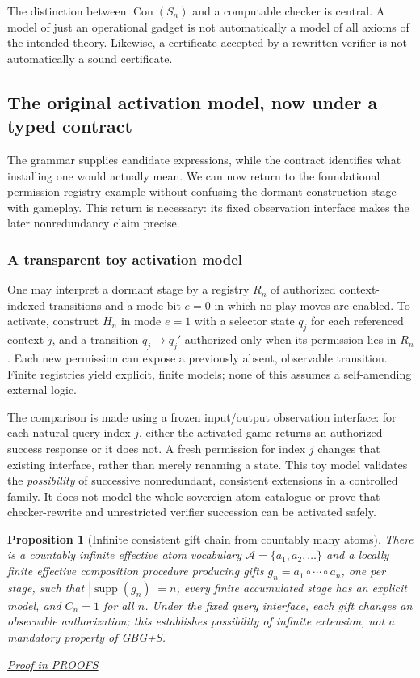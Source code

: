 \documentclass[11pt,letterpaper]{article}
\newtheorem{proposition}[theorem]{Proposition}
\theoremstyle{definition}\newtheorem{definition}[theorem]{Definition}\newtheorem{example}[theorem]{Example}
\theoremstyle{remark}\newtheorem{remark}[theorem]{Remark}
\newcommand{\Con}{\operatorname{Con}}
\newcommand{\Abs}{\mathcal{A}}
\newcommand{\proofat}[1]{\par\smallskip\noindent\hfill\textit{\hyperref[#1]{Proof in PROOFS}}}
\begin{document}
The distinction between $\Con(S_n)$ and a computable checker is central. A model of just an operational gadget is not automatically a model of all axioms of the intended theory. Likewise, a certificate accepted by a rewritten verifier is not automatically a sound certificate.



\subsection{The original activation model, now under a typed contract}
The grammar supplies candidate expressions, while the contract identifies what installing one
would actually mean.  We can now return to the foundational permission-registry example
without confusing the dormant construction stage with gameplay.  This return is necessary:
its fixed observation interface makes the later nonredundancy claim precise.

\subsubsection{A transparent toy activation model}
One may interpret a dormant stage by a registry $R_n$ of authorized context-indexed transitions and a mode bit $e=0$ in which no play moves are enabled. To activate, construct $H_n$ in mode $e=1$ with a selector state $q_j$ for each referenced context $j$, and a transition $q_j\to q_j'$ authorized only when its permission lies in $R_n$. Each new permission can expose a previously absent, observable transition. Finite registries yield explicit, finite models; none of this assumes a self-amending external logic.

The comparison is made using a frozen input/output observation interface: for each natural query index $j$, either the activated game returns an authorized success response or it does not. A fresh permission for index $j$ changes that existing interface, rather than merely renaming a state. This toy model validates the \emph{possibility} of successive nonredundant, consistent extensions in a controlled family. It does not model the whole sovereign atom catalogue or prove that checker-rewrite and unrestricted verifier succession can be activated safely.

\begin{proposition}[Infinite consistent gift chain from countably many atoms]\label{w0:prop:infinite}
There is a countably infinite effective atom vocabulary $\Abs=\{a_1,a_2,\ldots\}$ and a locally finite effective composition procedure producing gifts $g_n=a_1\circ\cdots\circ a_n$, one per stage, such that $|\operatorname{supp}(g_n)|=n$, every finite accumulated stage has an explicit model, and $C_n=1$ for all $n$. Under the fixed query interface, each gift changes an observable authorization; this establishes \emph{possibility} of infinite extension, not a mandatory property of GBG+S.\proofat{w0:pr:infinite}
\end{proposition}
\end{document}
